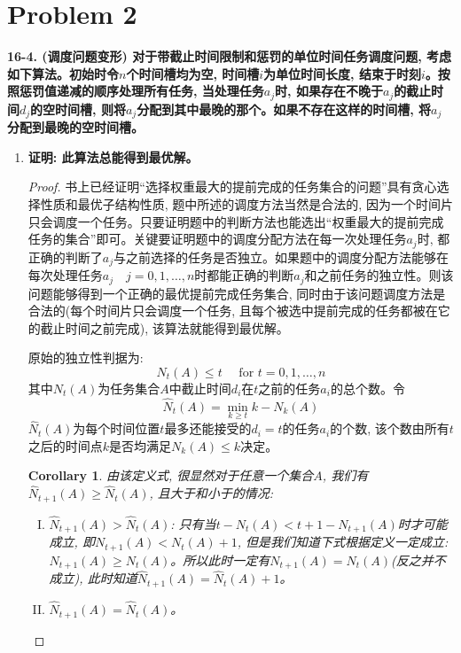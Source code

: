 \documentclass[paper=a4, fontsize=11pt]{scrartcl} %
\numberwithin{equation}{section} %
\numberwithin{figure}{section} %
\numberwithin{table}{section} %
\newtheorem{corollary}{Corollary}[theorem]
\begin{document}
\section{Problem 2}
\textbf{16-4. (调度问题变形) 对于带截止时间限制和惩罚的单位时间任务调度问题, 考虑如下算法。初始时令$n$个时间槽均为空, 时间槽$i$为单位时间长度, 结束于时刻$i$。按照惩罚值递减的顺序处理所有任务, 当处理任务$a_j$时, 如果存在不晚于$a_j$的截止时间$d_j$的空时间槽, 则将$a_j$分配到其中最晚的那个。如果不存在这样的时间槽, 将$a_j$分配到最晚的空时间槽。}

\begin{enumerate}[a]
\item \textbf{证明: 此算法总能得到最优解。}

  \begin{proof}
  书上已经证明``选择权重最大的提前完成的任务集合的问题''具有贪心选择性质和最优子结构性质, 题中所述的调度方法当然是合法的, 因为一个时间片只会调度一个任务。只要证明题中的判断方法也能选出``权重最大的提前完成任务的集合''即可。关键要证明题中的调度分配方法在每一次处理任务$a_j$时, 都正确的判断了$a_j$与之前选择的任务是否独立。如果题中的调度分配方法能够在每次处理任务$a_j \quad j = 0, 1, \dots, n$时都能正确的判断$a_j$和之前任务的独立性。则该问题能够得到一个正确的最优提前完成任务集合, 同时由于该问题调度方法是合法的(每个时间片只会调度一个任务, 且每个被选中提前完成的任务都被在它的截止时间之前完成), 该算法就能得到最优解。

  原始的独立性判据为:
  \[
  N_t(A) \leq t \quad \mbox{ for } t = 0,1, \dots, n
  \]
  其中$N_t(A)$为任务集合$A$中截止时间$d_i$在$t$之前的任务$a_i$的总个数。令
  \[
  \hat{N}_t(A) = \min_{k \geq t}{k - N_k(A)}
  \]
  $\hat{N}_t(A)$为每个时间位置$t$最多还能接受的$d_i = t$的任务$a_i$的个数, 该个数由所有$t$之后的时间点$k$是否均满足$N_k(A) \leq k$决定。
  \begin{corollary}
  由该定义式, 很显然对于任意一个集合$A$, 我们有$\hat{N}_{t+1}(A) \geq \hat{N}_t(A)$, 且大于和小于的情况:
  \begin{enumerate}[(I)]
  \item\label{corollary:em1} $\hat{N}_{t+1}(A) > \hat{N}_t(A)$: 只有当$t - N_t(A) < t + 1 - N_{t+1}(A)$时才可能成立, 即$N_{t+1}(A) < N_t(A) + 1$, 但是我们知道下式根据定义一定成立: $N_{t+1}(A) \geq N_t(A)$。所以此时一定有$N_{t+1}(A) = N_t(A)$(反之并不成立), 此时知道$\hat{N}_{t+1}(A) = \hat{N}_t(A) + 1$。
  \item $\hat{N}_{t+1}(A) = \hat{N}_t(A)$。
  \end{enumerate}
  \end{corollary}


\end{proof}
\end{enumerate}
\end{document}
